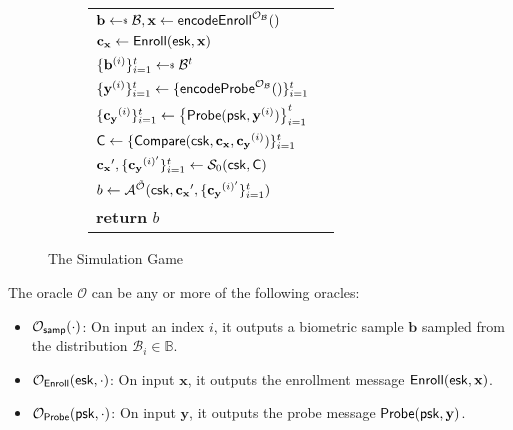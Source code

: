 \begin{figure}[h]
\begin{center}
\begin{subfigure}[t]{0.49\textwidth}
\begin{tabular}{l c}
			$ \mathbf{b} \getsdollar \mathcal{B}, \mathbf{x} \gets {\sf encodeEnroll}^{\mathcal{O}_{\mathcal{B}}}()$ \\

			$\mathbf{c_x} \gets {\sf Enroll}({\sf esk}, \mathbf{x})$ \\

			$\{ \mathbf{b}^{(i)} \}_{i=1}^t \getsdollar \mathcal{B}^t$ \\ 

			$\{\mathbf{y}^{(i)}\}_{i=1}^t \gets \{{\sf encodeProbe}^{\mathcal{O}_{\mathcal{B}}}()\}_{i=1}^t $ \\
			
			$\{ \mathbf{c_y}^{(i)} \}_{i=1}^t \gets \left\{ {\sf Probe}( {\sf psk}, \mathbf{y}^{(i)} ) \right \}_{i=1}^t$ \\

			${\sf C} \gets \{ {\sf Compare}({\sf csk}, \mathbf{c_x}, \mathbf{c_y}^{(i)}) \}_{i=1}^t$ \\

			$\mathbf{c_x}', \{\mathbf{c_y}^{(i)'}\}_{i=1}^t \gets \mathcal{S}_0( {\sf csk}, {\sf C} )$ \\

			$b \gets \mathcal{A}^{\tilde{\mathcal{O}}} ({\sf csk}, \mathbf{c_x}', \{ \mathbf{c_y}^{(i)'} \}_{i=1}^t )$ \\

			\textbf{return} $b$
			
		\end{tabular}
		\end{subfigure}
	\end{center}
	\caption{The Simulation Game}
	\label{fig:sim_game}
\end{figure}

The oracle $\mathcal{O}$ can be any or more of the following oracles:

\begin{itemize}

	\item $\mathcal{O}_{\sf samp}(\cdot)$: On input an index $i$, it outputs a biometric sample $\mathbf{b}$ sampled from the distribution $\mathcal{B}_i \in \mathbb{B}$.

	\item $\mathcal{O}_{\sf Enroll}({\sf esk}, \cdot)$: On input $\mathbf{x}$, it outputs the enrollment message ${\sf Enroll}({\sf esk}, \mathbf{x})$.

	\item $\mathcal{O}_{\sf Probe}({\sf psk}, \cdot)$: On input $\mathbf{y}$, it outputs the probe message ${\sf Probe}({\sf psk}, \mathbf{y})$.

\end{itemize}

